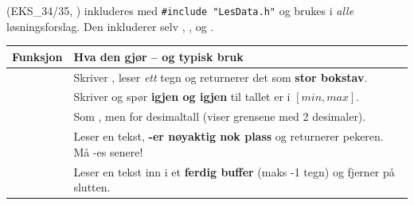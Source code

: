 

 (EKS\_34/35, \href{https://frh.folk.ntnu.no/grprog/eksempler/LesData.h}{})
inkluderes med \lstinline|#include "LesData.h"| og brukes i \emph{alle} løsningsforslag.
Den inkluderer selv , ,  og .

\begin{center}
\begin{tabular}{@{}L{6.4cm}L{9.2cm}@{}}
\toprule
\textbf{Funksjon} & \textbf{Hva den gjør -- og typisk bruk} \\
\midrule
{} &
Skriver , leser \emph{ett} tegn og returnerer det som \textbf{stor bokstav}. \newline
{} \\
 \newline {} &
Skriver  og spør \textbf{igjen og igjen} til tallet er i $[\mathit{min}, \mathit{max}]$. \newline
{} \\
 \newline {} &
Som , men for desimaltall (viser grensene med 2 desimaler). \newline
{} \\
 &
Leser en tekst, \textbf{-er nøyaktig nok plass} og returnerer pekeren. Må -es senere! \newline
{} \\
 \newline {} &
Leser en tekst inn i et \textbf{ferdig buffer} (maks -1 tegn) og fjerner  på slutten. \newline
{} \\
\bottomrule
\end{tabular}
\end{center}

